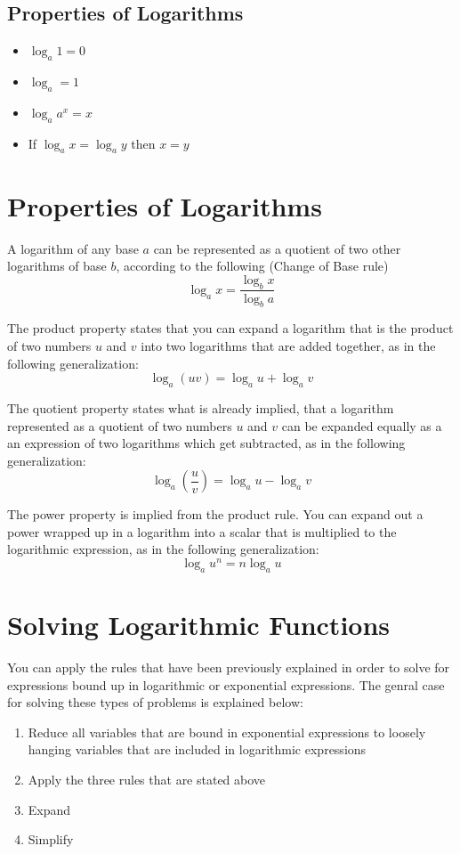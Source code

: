 
\subsection{Properties of Logarithms}
\begin{itemize}
  \item{$\log_a1=0$}
  \item{$\log_a=1$}
  \item{$\log_aa^x=x$}
  \item{If $\log_ax=\log_ay$ then $x=y$}
\end{itemize}

\section{Properties of Logarithms}
A logarithm of any base $a$ can be represented as a quotient of two other
logarithms of base $b$, according to the following (Change of Base rule)
\begin{equation}
  \log_ax=\frac{\log_bx}{\log_ba}
\end{equation}

The product property states that you can expand a logarithm that is the product
of two numbers $u$ and $v$ into two logarithms that are added together, as in
the following generalization:
\begin{equation}
  \log_a(uv)=\log_au+\log_av
\end{equation}

The quotient property states what is already implied, that a logarithm
represented as a quotient of two numbers $u$ and $v$ can be expanded equally as
a an expression of two logarithms which get subtracted, as in the following
generalization:
\begin{equation}
  \log_a(\frac{u}{v})=\log_au-\log_av
\end{equation}

The power property is implied from the product rule.  You can expand out a power
wrapped up in a logarithm into a scalar that is multiplied to the logarithmic
expression, as in the following generalization:
\begin{equation}
  \log_au^n=n\log_au
\end{equation}

\section{Solving Logarithmic Functions}
You can apply the rules that have been previously explained in order to solve
for expressions bound up in logarithmic or exponential expressions.  The genral
case for solving these types of problems is explained below:

\begin{enumerate}
  \item{Reduce all variables that are bound in exponential expressions to
    loosely hanging variables that are included in logarithmic expressions}
  \item{Apply the three rules that are stated above}
  \item{Expand}
  \item{Simplify}
\end{enumerate}
